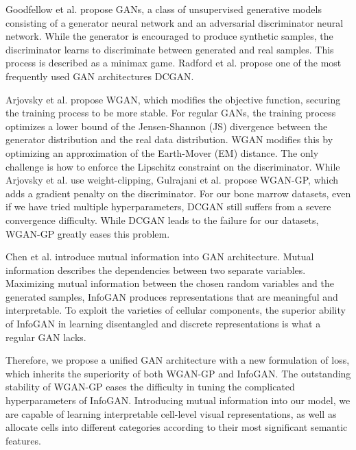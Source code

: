 \documentclass[journal]{IEEEtran}
\begin{document}
Goodfellow et al. \cite{goodfellow2014generative} propose GANs, a class of unsupervised generative models consisting of a generator neural network and an adversarial discriminator neural network. While the generator is encouraged to produce synthetic samples, the discriminator learns to discriminate between generated and real samples. This process is described as a minimax game. Radford et al. \cite{radford2015unsupervised} propose one of the most frequently used GAN architectures DCGAN.

Arjovsky et al. \cite{arjovsky2017wasserstein} propose WGAN, which modifies the objective function, securing the training process to be more stable. For regular GANs, the training process optimizes a lower bound of the Jensen-Shannon (JS) divergence between the generator distribution and the real data distribution. WGAN modifies this by optimizing an approximation of the Earth-Mover (EM) distance. The only challenge is how to enforce the Lipschitz constraint on the discriminator. While Arjovsky et al. \cite{arjovsky2017wasserstein} use weight-clipping, Gulrajani et al. \cite{gulrajani2017improved} propose WGAN-GP, which adds a gradient penalty on the discriminator. For our bone marrow datasets, even if we have tried multiple hyperparameters, DCGAN still suffers from a severe convergence difficulty. While DCGAN leads to the failure for our datasets, WGAN-GP greatly eases this problem.

Chen et al. \cite{chen2016infoGAN} introduce mutual information into GAN architecture. Mutual information describes the dependencies between two separate variables. Maximizing mutual information between the chosen random variables and the generated samples, InfoGAN produces representations that are meaningful and interpretable. To exploit the varieties of cellular components, the superior ability of InfoGAN in learning disentangled and discrete representations is what a regular GAN lacks.

Therefore, we propose a unified GAN architecture with a new formulation of loss, which inherits the superiority of both WGAN-GP and InfoGAN. The outstanding stability of WGAN-GP eases the difficulty in tuning the complicated hyperparameters of InfoGAN. Introducing mutual information into our model, we are capable of learning interpretable cell-level visual representations, as well as allocate cells into different categories according to their most significant semantic features.

\end{document}
